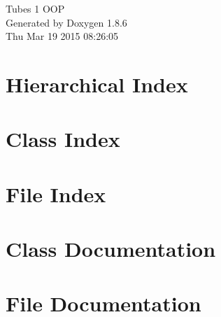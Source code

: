 \documentclass[twoside]{book}
\newcommand{\clearemptydoublepage}{%
  \newpage{\pagestyle{empty}\cleardoublepage}%
}
\begin{document}
\hypersetup{pageanchor=false}
\begin{titlepage}
\vspace*{7cm}
\begin{center}%
{\Large Tubes 1 O\-O\-P }\\
\vspace*{1cm}
{\large Generated by Doxygen 1.8.6}\\
\vspace*{0.5cm}
{\small Thu Mar 19 2015 08:26:05}\\
\end{center}
\end{titlepage}
\clearemptydoublepage
\tableofcontents
\clearemptydoublepage
{}
\hypersetup{pageanchor=true}

\chapter{Hierarchical Index}

\chapter{Class Index}

\chapter{File Index}

\chapter{Class Documentation}


















\chapter{File Documentation}













































\newpage
{}
{}
\printindex
\end{document}

